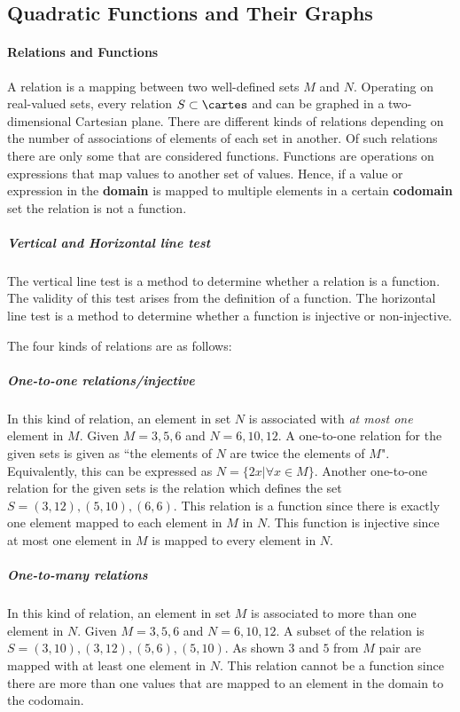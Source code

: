 \subsection{Quadratic Functions and Their Graphs}
\paragraph{Relations and Functions}
A relation is a mapping between two well-defined sets $M$ and $N$.
Operating on real-valued sets, every relation $S \subset \cartes$ and can be graphed in a two-dimensional Cartesian plane.
There are different kinds of relations depending on the number of associations of elements of each set in another.
Of such relations there are only some that are considered functions.
Functions are operations on expressions that map values to another set of values.
Hence, if a value or expression in the \textbf{domain} is mapped to multiple elements in a certain \textbf{codomain} set the relation is not a function.

\subparagraph{Vertical and Horizontal line test}
The vertical line test is a method to determine whether a relation is a function.
The validity of this test arises from the definition of a function.
The horizontal line test is a method to determine whether a function is injective or non-injective.

The four kinds of relations are as follows:

\subparagraph{One-to-one relations/injective}
In this kind of relation, an element in set $N$ is associated with \emph{at most one} element in $M$.
Given $M = {3, 5, 6}$ and $N = {6, 10, 12}$.
A one-to-one relation for the given sets is given as ``the elements of $N$ are twice the elements of $M$".
Equivalently, this can be expressed as $N = \{2x | \forall x \in M\}$.
Another one-to-one relation for the given sets is the relation which defines the set $S = {(3, 12), (5, 10), (6, 6)}$.
This relation is a function since there is exactly one element mapped to each element in $M$ in $N$.
This function is injective since at most one element in $M$ is mapped to every element in $N$.

\subparagraph{One-to-many relations}
In this kind of relation, an element in set $M$ is associated to more than one element in $N$.
Given $M = {3, 5, 6}$ and $N = {6, 10, 12}$.
A subset of the relation is $S = {(3, 10), (3, 12), (5, 6), (5, 10)}$.
As shown $3$ and $5$ from $M$ pair are mapped with at least one element in $N$.
This relation cannot be a function since there are more than one values that are mapped to an element in the domain to the codomain.

